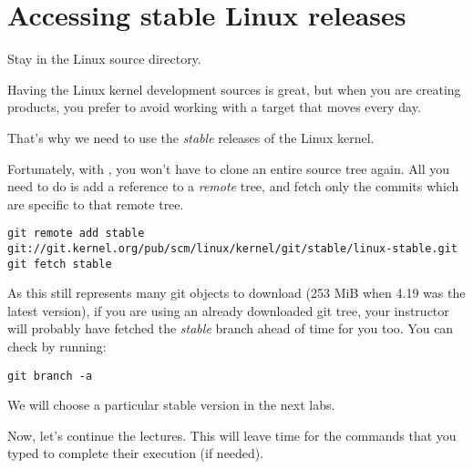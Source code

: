 \section{Accessing stable Linux releases}

Stay in the Linux source directory.

Having the Linux kernel development sources is great, but when you are
creating products, you prefer to avoid working with a target that moves
every day.

That's why we need to use the {\em stable} releases of the Linux
kernel.

Fortunately, with , you won't have to clone an entire source
tree again. All you need to do is add a reference to a {\em remote}
tree, and fetch only the commits which are specific to that remote tree.

{\footnotesize
\begin{verbatim}
git remote add stable git://git.kernel.org/pub/scm/linux/kernel/git/stable/linux-stable.git
git fetch stable
\end{verbatim}
}

As this still represents many git objects to download (253 MiB when 4.19 was
the latest version), if you are using an already downloaded git tree,
your instructor will probably have fetched the {\em stable} branch ahead
of time for you too. You can check by running:

\begin{verbatim}
git branch -a
\end{verbatim}

We will choose a particular stable version in the next labs.

Now, let's continue the lectures. This will leave time for the commands
that you typed to complete their execution (if needed).
